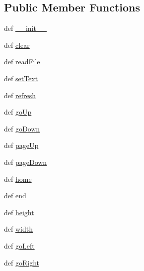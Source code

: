 \subsection*{Public Member Functions}
\begin{DoxyCompactItemize}
\item 
def \hyperlink{classcurseshelpers_1_1Text_a8d172eeb38523f21420dc2e8b04fc614}{\-\_\-\-\_\-init\-\_\-\-\_\-}
\item 
def \hyperlink{classcurseshelpers_1_1Text_ad9bad398596eafdf959a76c218496479}{clear}
\item 
def \hyperlink{classcurseshelpers_1_1Text_adc8626f867e82c69db0da9c609ba2022}{read\-File}
\item 
def \hyperlink{classcurseshelpers_1_1Text_a73b690b81848ec0d22a90c55263ff765}{set\-Text}
\item 
def \hyperlink{classcurseshelpers_1_1Text_a321fb7f69be736745ac909f6eda64c51}{refresh}
\item 
def \hyperlink{classcurseshelpers_1_1Text_a13742f32df40bcf112e4991017a18aa5}{go\-Up}
\item 
def \hyperlink{classcurseshelpers_1_1Text_a626a74ea0e8fab759016547bac3f683a}{go\-Down}
\item 
def \hyperlink{classcurseshelpers_1_1Text_aa69b9cbbb16ff4f4caa792d1ce0c1af9}{page\-Up}
\item 
def \hyperlink{classcurseshelpers_1_1Text_aa78869dc4e1e38ddf0ddccd2027db234}{page\-Down}
\item 
def \hyperlink{classcurseshelpers_1_1Text_a3c7a028abba3c66e668f81e03b2d4553}{home}
\item 
def \hyperlink{classcurseshelpers_1_1Text_a0f051b00ccfbcb3608cbd9c0b97d796d}{end}
\item 
def \hyperlink{classcurseshelpers_1_1Text_a030619a9550c10b619c6c5bc067c9b45}{height}
\item 
def \hyperlink{classcurseshelpers_1_1Text_abe05b0b5ad15256592bf33eda17e64ac}{width}
\item 
def \hyperlink{classcurseshelpers_1_1BaseElement_a8dad4b03794798c7b6de02554312859f}{go\-Left}
\item 
def \hyperlink{classcurseshelpers_1_1BaseElement_aac34d4e8081c795ff91dd124a997cf2a}{go\-Right}
\end{DoxyCompactItemize}
